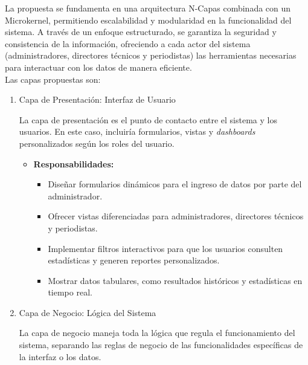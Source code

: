 \documentclass{report}
\begin{document}
    La propuesta se fundamenta en una arquitectura N-Capas combinada con un Microkernel, permitiendo escalabilidad y 
    modularidad en la funcionalidad del sistema. A través de un enfoque estructurado, se garantiza la seguridad y consistencia de 
    la información, ofreciendo a cada actor del sistema (administradores, directores técnicos y periodistas) las herramientas necesarias 
    para interactuar con los datos de manera eficiente.\\

    Las capas propuestas son:

    \begin{enumerate}
        \item Capa de Presentación: Interfaz de Usuario
        
        La capa de presentación es el punto de contacto entre el sistema y los usuarios. En este caso, incluiría 
        formularios, vistas y \textit{dashboards} personalizados según los roles del usuario.
        
        \begin{itemize}
            \item \textbf{Responsabilidades:}
            \begin{itemize}
                \item Diseñar formularios dinámicos para el ingreso de datos por parte del administrador.
                \item Ofrecer vistas diferenciadas para administradores, directores técnicos y periodistas.
                \item Implementar filtros interactivos para que los usuarios consulten estadísticas y generen 
                reportes personalizados.
                \item Mostrar datos tabulares, como resultados históricos y estadísticas en tiempo real.
            \end{itemize}
        \end{itemize}
        
        \item Capa de Negocio: Lógica del Sistema
        
        La capa de negocio maneja toda la lógica que regula el funcionamiento del sistema, separando las reglas de 
        negocio de las funcionalidades específicas de la interfaz o los datos.
        

\end{enumerate}
\end{document}

